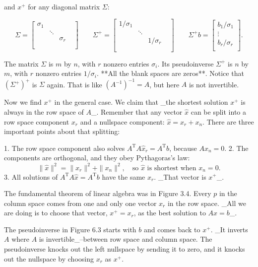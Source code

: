 and \(x^{+}\) for any diagonal matrix \(\Sigma\):

\[\Sigma=\begin{bmatrix}\sigma_{1}&&\\ &\ddots&\\ &&\sigma_{r}\\ &&&\\ \end{bmatrix}\qquad\Sigma^{+}=\begin{bmatrix}1/\sigma_{1}&&\\ &\ddots&\\ &&1/\sigma_{r}\\ &&&\\ \end{bmatrix}\qquad\Sigma^{+}b=\begin{bmatrix}b_{1}/\sigma_{1}\\ \vdots\\ b_{r}/\sigma_{r}\\ \end{bmatrix}.\]

The matrix \(\Sigma\) is \(m\) by \(n\), with \(r\) nonzero entries \(\sigma_{i}\). Its pseudoinverse \(\Sigma^{+}\) is \(n\) by \(m\), with \(r\) nonzero entries \(1/\sigma_{i}\). **All the blank spaces are zeros**. Notice that \((\Sigma^{+})^{+}\) is \(\Sigma\) again. That is like \((A^{-1})^{-1}=A\), but here \(A\) is not invertible.

Now we find \(x^{+}\) in the general case. We claim that _the shortest solution \(x^{+}\) is always in the row space of \(A\)_. Remember that any vector \(\widehat{x}\) can be split into a row space component \(x_{r}\) and a nullspace component: \(\widehat{x}=x_{r}+x_{n}\). There are three important points about that splitting:

1. The row space component also solves \(A^{\mathrm{T}}A\widehat{x}_{r}=A^{\mathrm{T}}b\), because \(Ax_{n}=0\).
2. The components are orthogonal, and they obey Pythagoras's law: \[\|\widehat{x}\|^{2}=\|x_{r}\|^{2}+\|x_{n}\|^{2},\quad\text{so $\widehat{x}$ is shortest when $x_{n}=0$.}\]
3. All solutions of \(A^{\mathrm{T}}A\widehat{x}=A^{\mathrm{T}}b\) have the same \(x_{r}\). _That vector is \(x^{+}\)_.

The fundamental theorem of linear algebra was in Figure 3.4. Every \(p\) in the column space comes from one and only one vector \(x_{r}\) in the row space. _All we are doing is to choose that vector, \(x^{+}=x_{r}\), as the best solution to \(Ax=b\)_.

The pseudoinverse in Figure 6.3 starts with \(b\) and comes back to \(x^{+}\). _It inverts \(A\) where \(A\) is invertible_--between row space and column space. The pseudoinverse knocks out the left nullspace by sending it to zero, and it knocks out the nullspace by choosing \(x_{r}\) as \(x^{+}\).

